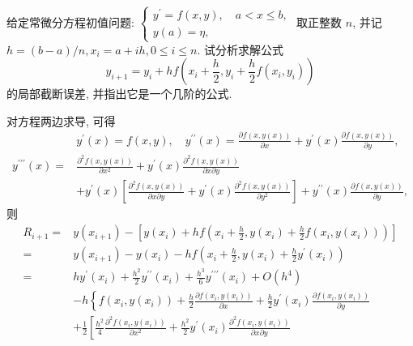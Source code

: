   \begin{tcolorbox}[enhanced,colback=8,colframe=7,breakable,coltitle=green!25!black,title=2024]
 给定常微分方程初值问题:
$
\left\{\begin{array}{l}
y^{\prime}=f(x, y), \quad a<x \leqslant b, \\
y(a)=\eta,
\end{array}\right.
$
取正整数 $ n $, 并记 $ h=(b-a) / n, x_{i}=a+i h, 0 \leqslant i \leqslant n $. 试分析求解公式
$$
y_{i+1}=y_{i}+h f\left(x_{i}+\frac{h}{2}, y_{i}+\frac{h}{2} f\left(x_{i}, y_{i}\right)\right)
$$
的局部截断误差, 并指出它是一个几阶的公式.
 \tcblower

 对方程两边求导, 可得
$$
\begin{aligned}
& y^{\prime}(x)=f(x, y), \quad y^{\prime \prime}(x)=\frac{\partial f(x, y(x))}{\partial x}+y^{\prime}(x) \frac{\partial f(x, y(x))}{\partial y}, \\
y^{\prime \prime \prime}(x)= & \frac{\partial^{2} f(x, y(x))}{\partial x^{2}}+y^{\prime}(x) \frac{\partial^{2} f(x, y(x))}{\partial x \partial y} \\
& +y^{\prime}(x)\left[\frac{\partial^{2} f(x, y(x))}{\partial x \partial y}+y^{\prime}(x) \frac{\partial^{2} f(x, y(x))}{\partial y^{2}}\right]+y^{\prime \prime}(x) \frac{\partial f(x, y(x))}{\partial y},
\end{aligned}
$$
则
$$
\begin{aligned}
R_{i+1}= & y\left(x_{i+1}\right)-\left[y\left(x_{i}\right)+h f\left(x_{i}+\frac{h}{2}, y\left(x_{i}\right)+\frac{h}{2} f\left(x_{i}, y\left(x_{i}\right)\right)\right)\right] \\
= & y\left(x_{i+1}\right)-y\left(x_{i}\right)-h f\left(x_{i}+\frac{h}{2}, y\left(x_{i}\right)+\frac{h}{2} y^{\prime}\left(x_{i}\right)\right) \\
= & h y^{\prime}\left(x_{i}\right)+\frac{h^{2}}{2} y^{\prime \prime}\left(x_{i}\right)+\frac{h^{3}}{6} y^{\prime \prime \prime}\left(x_{i}\right)+O\left(h^{4}\right) \\
& -h\left\{f\left(x_{i}, y\left(x_{i}\right)\right)+\frac{h}{2} \frac{\partial f\left(x_{i}, y\left(x_{i}\right)\right)}{\partial x}+\frac{h}{2} y^{\prime}\left(x_{i}\right) \frac{\partial f\left(x_{i}, y\left(x_{i}\right)\right)}{\partial y}\right. \\
& +\frac{1}{2}\left[\frac{h^{2}}{4} \frac{\partial^{2} f\left(x_{i}, y\left(x_{i}\right)\right)}{\partial x^{2}}+\frac{h^{2}}{2} y^{\prime}\left(x_{i}\right) \frac{\partial^{2} f\left(x_{i}, y\left(x_{i}\right)\right)}{\partial x \partial y}\right. \\

\end{aligned}$$
\end{tcolorbox}
